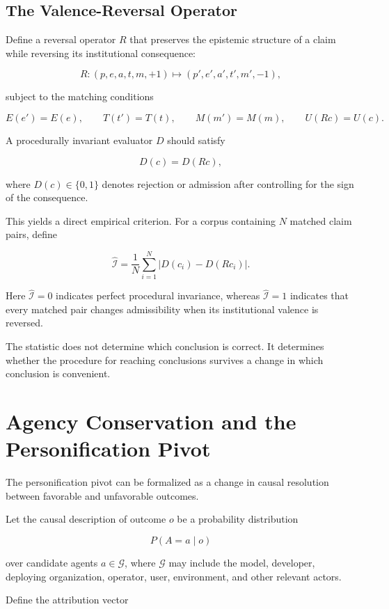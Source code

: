\documentclass[11pt]{article}
\begin{document}
\subsection{The Valence-Reversal Operator}

Define a reversal operator \(R\) that preserves the epistemic structure of a
claim while reversing its institutional consequence:

\[
R:
(p,e,a,t,m,+1)
\mapsto
(p',e',a',t',m',-1),
\]

subject to the matching conditions

\[
E(e')=E(e),\qquad
T(t')=T(t),\qquad
M(m')=M(m),\qquad
U(Rc)=U(c).
\]

A procedurally invariant evaluator \(D\) should satisfy

\[
D(c)=D(Rc),
\]

where \(D(c)\in\{0,1\}\) denotes rejection or admission after controlling for
the sign of the consequence.

This yields a direct empirical criterion. For a corpus containing \(N\)
matched claim pairs, define

\[
\widehat{\mathcal I}
=
\frac{1}{N}
\sum_{i=1}^{N}
\left|
D(c_i)-D(Rc_i)
\right|.
\]

Here \(\widehat{\mathcal I}=0\) indicates perfect procedural invariance,
whereas \(\widehat{\mathcal I}=1\) indicates that every matched pair changes
admissibility when its institutional valence is reversed.

The statistic does not determine which conclusion is correct. It determines
whether the procedure for reaching conclusions survives a change in which
conclusion is convenient.


\section{Agency Conservation and the Personification Pivot}

The personification pivot can be formalized as a change in causal resolution
between favorable and unfavorable outcomes.

Let the causal description of outcome \(o\) be a probability distribution

\[
P(A=a\mid o)
\]

over candidate agents \(a\in\mathcal G\), where \(\mathcal G\) may include the
model, developer, deploying organization, operator, user, environment, and
other relevant actors.

Define the attribution vector
\end{document}
